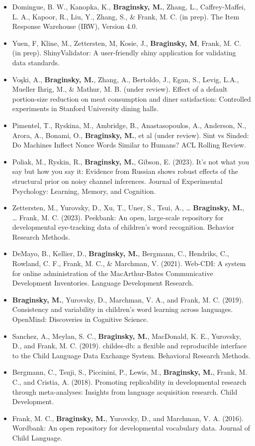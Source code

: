\documentclass[11pt,]{article}
\begin{document}
\begin{itemize}
\item
  Domingue, B. W., Kanopka, K., \textbf{Braginsky, M.}, Zhang, L.,
  Caffrey-Maffei, L. A., Kapoor, R., Liu, Y., Zhang, S., \& Frank, M. C.
  (in prep). The Item Response Warehouse (IRW), Version 4.0.
\item
  Yuen, F, Kline, M., Zettersten, M, Kosie, J., \textbf{Braginsky, M},
  Frank, M. C. (in prep). ShinyValidator: A user-friendly shiny
  application for validating data standards.
\item
  Voşki, A., \textbf{Braginsky, M.}, Zhang, A., Bertoldo, J., Egan, S.,
  Levig, L.A., Mueller Ihrig, M., \& Mathur, M. B. (under review).
  Effect of a default portion-size reduction on meat consumption and
  diner satisfaction: Controlled experiments in Stanford University
  dining halls.
\item
  Pimentel, T., Ryskina, M., Ambridge, B., Anastasopoulos, A., Anderson,
  N., Arora, A., Bonami, O., \textbf{Braginsky, M.}, et al (under
  review). Sint vs Sinded: Do Machines Inflect Nonce Words Similar to
  Humans? ACL Rolling Review.
\item
  Poliak, M., Ryskin, R., \textbf{Braginsky, M.}, Gibson, E. (2023).
  It's not what you say but how you say it: Evidence from Russian shows
  robust effects of the structural prior on noisy channel inferences.
  Journal of Experimental Psychology: Learning, Memory, and Cognition.
\item
  Zettersten, M., Yurovsky, D., Xu, T., Uner, S., Tsui, A., \ldots{}
  \textbf{Braginsky, M.}, \ldots{} Frank, M. C. (2023). Peekbank: An
  open, large-scale repository for developmental eye-tracking data of
  children's word recognition. Behavior Research Methods.
\item
  DeMayo, B., Kellier, D., \textbf{Braginsky, M.}, Bergmann, C.,
  Hendriks, C., Rowland, C. F., Frank, M. C., \& Marchman, V. (2021).
  Web-CDI: A system for online administration of the MacArthur-Bates
  Communicative Development Inventories. Language Development Research.
\item
  \textbf{Braginsky, M.}, Yurovsky, D., Marchman, V. A., and Frank, M.
  C. (2019). Consistency and variability in children's word learning
  across languages. OpenMind: Discoveries in Cognitive Science.
\item
  Sanchez, A., Meylan, S. C., \textbf{Braginsky, M.}, MacDonald, K. E.,
  Yurovsky, D., and Frank, M. C. (2019). childes-db: a flexible and
  reproducible interface to the Child Language Data Exchange System.
  Behavioral Research Methods.
\item
  Bergmann, C., Tsuji, S., Piccinini, P., Lewis, M., \textbf{Braginsky,
  M.}, Frank, M. C., and Cristia, A. (2018). Promoting replicability in
  developmental research through meta-analyses: Insights from language
  acquisition research. Child Development.
\item
  Frank, M. C., \textbf{Braginsky, M.}, Yurovsky, D., and Marchman, V.
  A. (2016). Wordbank: An open repository for developmental vocabulary
  data. Journal of Child Language.
\end{itemize}
\end{document}
